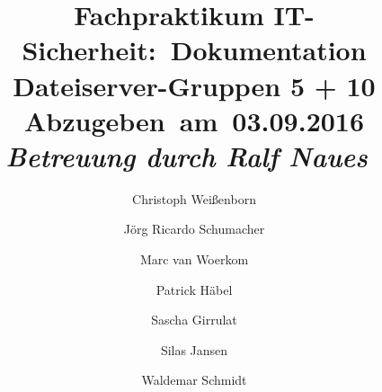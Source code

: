 
\newcommand{\Title}{Dokumentation Dateiserver-Gruppen 5 + 10} %
\newcommand{\DueDate}{03.09.2016} %
\newcommand{\Class}{Fachpraktikum IT-Sicherheit} %
\newcommand{\ClassTime}{} %
\newcommand{\ClassInstructor}{Ralf Naues} %


\title{
\vspace{0.5in} %
\textmd{\textbf{\Class:\ \Title}}\\
\normalsize\vspace{0.1in}\small{Abzugeben\ am\ \DueDate}\\
\vspace{0.1in}\large{\textit{Betreuung durch \ClassInstructor\ \ClassTime}}
\vspace{1in} %
}

\author[1]{Christoph Weißenborn}
\author[1]{Jörg Ricardo Schumacher}
\author[1]{Marc van Woerkom}
\author[1]{Patrick Häbel}
\author[2]{Sascha Girrulat}
\author[2]{Silas Jansen}
\author[1]{Waldemar Schmidt}
\date{} %
